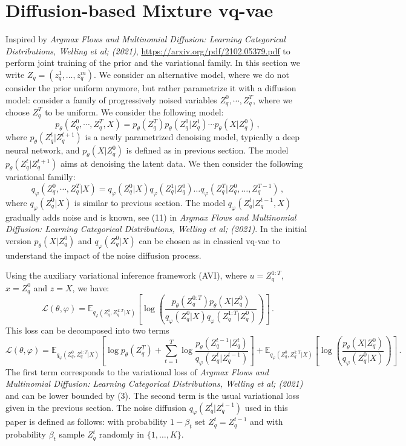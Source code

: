 \documentclass{article}
\begin{document}
\section{Diffusion-based Mixture vq-vae}
Inspired by {\em Argmax Flows and Multinomial Diffusion: Learning Categorical Distributions, Welling et al; (2021)}, \url{https://arxiv.org/pdf/2102.05379.pdf} to perform joint training of the prior and the variational family.
In this section we write $Z_q = (z_q^1,\ldots,z_q^m)$. We consider an alternative model, where we do not consider the prior uniform anymore, but rather parametrize it with a diffusion model: consider a family of progressively noised variables $Z_q^0, \cdots, Z_q^T$, where we choose $Z_q^T$ to be uniform. We consider the following model:
$$
p_{\theta}(Z_q^0, \cdots, Z_q^T, X) = p_{\theta}(Z_q^T) p_{\theta}(Z_q^0|Z_q^1) \cdots p_{\theta}(X|Z^0_q)\,,
$$
where $p_{\theta}(Z_q^t|Z_q^{t+1})$ is a newly parametrized denoising model, typically a deep neural network, and $p_{\theta}(X|Z^0_q)$ is defined as in previous section. The model $p_{\theta}(Z_q^t|Z_q^{t+1})$ aims at denoising the latent data. We then consider the following variational familly:
$$
q_{\varphi}(Z_q^0, \cdots, Z_q^T | X) = q_{\varphi}(Z_q^0 | X) q_{\varphi}(Z_q^1 | Z_q^0) \ldots  q_{\varphi}(Z_q^T | Z_q^0, \ldots,Z_q^{T-1})\,,
$$
where $q_{\varphi}(Z_q^0 | X)$ is similar to previous section. The model $q_{\varphi}(Z_q^t | Z_q^{t-1}, X)$ gradually adds noise and is known, see (11) in  {\em Argmax Flows and Multinomial Diffusion: Learning Categorical Distributions, Welling et al; (2021)}.
In the initial version $ p_{\theta}(X|Z^0_q)$ and $q_{\varphi}(Z_q^0 | X)$ can be chosen as in classical vq-vae to understand the impact of the noise diffusion process.

Using the auxiliary variational inference framework (AVI), where $u = Z_q^{1:T}$, $x = Z_q^0$ and $z = X$, we have:
$$
\mathcal{L}(\theta, \varphi) = \mathbb{E}_{q_\varphi (Z_q^0, Z_q^{1:T}|X)} \left[ \log\left(\frac{p_\theta(Z_q^{0:T})p_\theta(X|Z_q^0)}{q_\varphi(Z_q^0|X) q_\varphi(Z_q^{1:T}|Z_q^0)}\right) \right]\,.
$$
This loss can be decomposed into two terms
$$
\mathcal{L}(\theta, \varphi) = \mathbb{E}_{q_\varphi (Z_q^0, Z_q^{1:T}|X)} \left[\log p_\theta(Z_q^T) + \sum_{t=1}^T\log  \frac{p_\theta(Z_q^{t-1}|Z_q^t)}{q_\varphi(Z_q^{t}|Z_q^{t-1})} \right] + \mathbb{E}_{q_\varphi (Z_q^0, Z_q^{1:T}|X)} \left[ \log\left(\frac{p_\theta(X|Z_q^0)}{q_\varphi(Z_q^0|X)}\right) \right]\,.
$$
The first term corresponds to the variational loss of {\em Argmax Flows and Multinomial Diffusion: Learning Categorical Distributions, Welling et al; (2021)} and can be lower bounded by (3). The second term is the usual variational loss given in the previous section. The noise diffusion $q_{\varphi}(Z_q^t | Z_q^{t-1}) $ used in this paper is defined as follows: with probability $1 - \beta_t$ set $Z_q^t = Z_q^{t-1}$ and with probability $\beta_t$ sample $Z_q^t$ randomly in $\{1,\ldots, K\}$.
\end{document}
